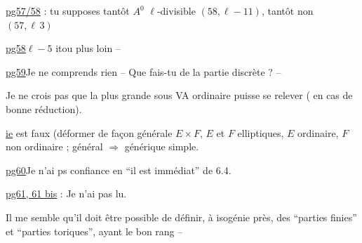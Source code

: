 
\uline{pg57/58} : tu supposes tantôt $A^0$ $\ell$-divisible $(58,\ell-11)$, tantôt non $(57,\ell\,3)$

\uline{pg58}\quad $\ell-5$\quad
{}
\qquad itou plus loin --

\uline{pg59}\quad Je ne comprends rien -- Que fais-tu de la partie discrète ? --

Je ne crois pas que la plus grande  sous VA ordinaire puisse se relever ( en cas de bonne réduction).

\uline{ie}\quad {} est faux (déformer de façon générale $E\times F$, $E$ et $F$ elliptiques, $E$ ordinaire, $F$ non ordinaire ; général $\Rightarrow$ générique simple.



\uline{pg60}\quad Je n'ai ps confiance en ``il est immédiat'' de 6.4.

\uline{pg61, 61 bis} : Je n'ai pas lu.

Il me semble qu'il doit être possible de définir, à isogénie près, des ``parties finies'' et ``parties toriques'', ayant le bon rang --

